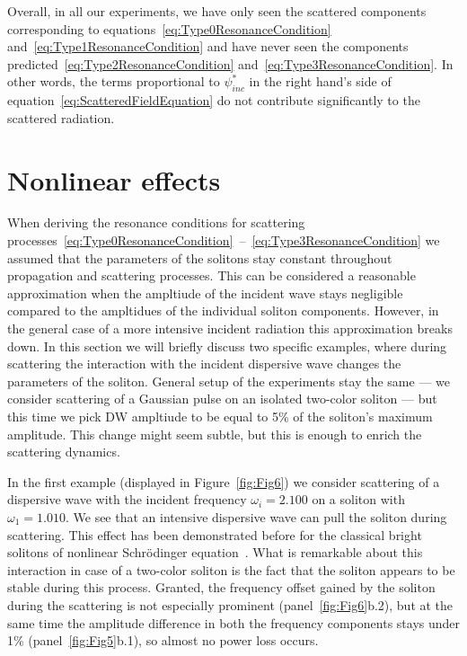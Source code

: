 \documentclass[aps, prl, twocolumn, superscriptaddress, final]{revtex4}
\begin{document}
Overall, in all our experiments, we have only seen the scattered components corresponding to equations~\eqref{eq:Type0ResonanceCondition} and~\eqref{eq:Type1ResonanceCondition} and have never seen the components predicted~\eqref{eq:Type2ResonanceCondition} and~\eqref{eq:Type3ResonanceCondition}. In other words, the terms proportional to $\psi_{inc}^{*}$ in the right hand's side of equation~\eqref{eq:ScatteredFieldEquation} do not contribute significantly to the scattered radiation.

\section{Nonlinear effects}

When deriving the resonance conditions for scattering processes~\eqref{eq:Type0ResonanceCondition}~--~\eqref{eq:Type3ResonanceCondition} we assumed that the parameters of the solitons stay constant throughout propagation and scattering processes. This can be considered a reasonable approximation when the ampltiude of the incident wave stays negligible compared to the ampltidues of the individual soliton components. However, in the general case of a more intensive incident radiation this approximation breaks down. In this section we will briefly discuss two specific examples, where during scattering the interaction with the incident dispersive wave changes the parameters of the soliton. General setup of the experiments stay the same --- we consider scattering of a Gaussian pulse on an isolated two-color soliton --- but this time we pick DW ampltiude to be equal to 5\% of the soliton's maximum amplitude. This change might seem subtle, but this is enough to enrich the scattering dynamics.

In the first example (displayed in Figure~\ref{fig:Fig6}) we consider scattering of a dispersive wave with the incident frequency $\omega_{i} = 2.100$ on a soliton with $\omega_{1} = 1.010$. We see that an intensive dispersive wave can pull the soliton during scattering. This effect has been demonstrated before for the classical bright solitons of nonlinear Schr\"odinger equation~\cite{demircan2011controlling, tartara2015soliton}. What is remarkable about this interaction in case of a two-color soliton is the fact that the soliton appears to be stable during this process. Granted, the frequency offset gained by the soliton during the scattering is not especially prominent (panel~\ref{fig:Fig6}b.2), but at the same time the amplitude difference in both the frequency components stays under 1\% (panel~\ref{fig:Fig5}b.1), so almost no power loss occurs.
\end{document}
